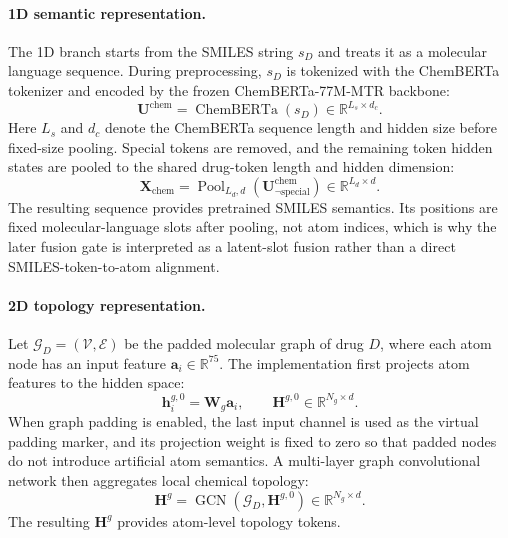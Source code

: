 \paragraph{1D semantic representation.}
The 1D branch starts from the SMILES string $s_D$ and treats it as a molecular
language sequence. During preprocessing, $s_D$ is tokenized with the ChemBERTa
tokenizer and encoded by the frozen ChemBERTa-77M-MTR backbone:
\begin{equation}
  \mathbf{U}^{\mathrm{chem}}=\operatorname{ChemBERTa}(s_D)
  \in\mathbb{R}^{L_s\times d_c}.
  \label{eq:chemberta_encoding}
\end{equation}
Here $L_s$ and $d_c$ denote the ChemBERTa sequence length and hidden size
before fixed-size pooling. Special tokens are removed, and the remaining token
hidden states are pooled to the shared drug-token length and hidden dimension:
\begin{equation}
  \mathbf{X}_{\mathrm{chem}}=\operatorname{Pool}_{L_d,d}
  \left(\mathbf{U}^{\mathrm{chem}}_{\neg\mathrm{special}}\right)
  \in\mathbb{R}^{L_d\times d}.
  \label{eq:chemberta_pooling}
\end{equation}
The resulting sequence provides pretrained SMILES semantics. Its positions are
fixed molecular-language slots after pooling, not atom indices, which is why the
later fusion gate is interpreted as a latent-slot fusion rather than a direct
SMILES-token-to-atom alignment.

\paragraph{2D topology representation.}
Let $\mathcal{G}_D=(\mathcal{V},\mathcal{E})$ be the padded molecular graph of
drug $D$, where each atom node has an input feature
$\mathbf{a}_i\in\mathbb{R}^{75}$. The implementation first projects atom
features to the hidden space:
\begin{equation}
  \mathbf{h}^{g,0}_i = \mathbf{W}_g\mathbf{a}_i,
  \qquad
  \mathbf{H}^{g,0}\in\mathbb{R}^{N_g\times d}.
  \label{eq:gcn_projection}
\end{equation}
When graph padding is enabled, the last input channel is used as the virtual
padding marker, and its projection weight is fixed to zero so that padded nodes
do not introduce artificial atom semantics. A multi-layer graph convolutional
network then aggregates local chemical topology:
\begin{equation}
  \mathbf{H}^{g} =
  \operatorname{GCN}(\mathcal{G}_D,\mathbf{H}^{g,0})
  \in\mathbb{R}^{N_g\times d}.
  \label{eq:gcn_output}
\end{equation}
The resulting $\mathbf{H}^{g}$ provides atom-level topology tokens.

